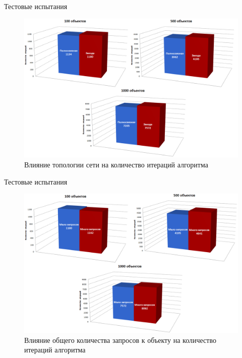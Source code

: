 \documentclass{beamer}
\begin{document}
\begin{frame}[fragile]{Тестовые испытания}
	\begin{figure}
		\includegraphics[scale=0.2]{img/histograms/top.png}
		\caption{Влияние топологии сети на количество итераций алгоритма}
	\end{figure}
\end{frame}

\begin{frame}[fragile]{Тестовые испытания}
	\begin{figure}
		\includegraphics[scale=0.2]{img/histograms/req.png}
		\caption{Влияние общего количества запросов к объекту на количество итераций алгоритма}
	\end{figure}
\end{frame}
\end{document}
